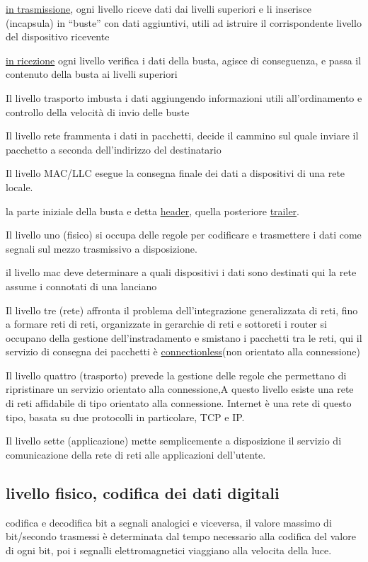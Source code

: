 \documentclass[12pt]{article}
\begin{document}
\underline{in trasmissione}, ogni livello riceve dati dai livelli superiori e li inserisce (incapsula) in “buste” con dati
aggiuntivi, utili ad istruire il corrispondente livello del dispositivo ricevente

\underline{in ricezione} ogni livello verifica i dati della busta, agisce di conseguenza, e passa il contenuto della busta
ai livelli superiori

Il livello trasporto imbusta i dati aggiungendo informazioni utili all’ordinamento e controllo della
velocità di invio delle buste

Il livello rete frammenta i dati in pacchetti, decide il cammino sul quale inviare il pacchetto a
seconda dell’indirizzo del destinatario

Il livello MAC/LLC esegue la consegna finale dei dati a dispositivi di una rete locale.

la parte iniziale della busta e detta \underline{header}, quella posteriore \underline{trailer}.


Il livello uno (fisico) si occupa delle regole per codificare e trasmettere i dati come segnali sul mezzo trasmissivo a disposizione.

il livello mac deve determinare a quali dispositivi i dati sono destinati qui la rete assume i connotati di una lanciano

Il livello tre (rete) affronta il problema dell’integrazione generalizzata di reti, fino a formare reti di reti,
organizzate in gerarchie di reti e sottoreti i router si occupano della gestione dell'instradamento e smistano i pacchetti tra le reti, qui il servizio
di consegna dei pacchetti è \underline{connectionless}(non orientato alla connessione)

Il livello quattro (trasporto) prevede la gestione delle regole che permettano di ripristinare un servizio orientato alla connessione,A questo livello esiste una rete di reti affidabile di tipo orientato alla connessione. Internet è una rete di questo tipo, basata su
due protocolli in particolare, TCP e IP.

Il livello sette (applicazione) mette semplicemente a disposizione il servizio di comunicazione della rete di reti alle applicazioni
dell’utente.

\subsection{livello fisico, codifica dei dati digitali}

codifica e decodifica bit a segnali analogici e viceversa, il valore massimo di bit/secondo trasmessi
è determinata dal tempo necessario alla codifica del valore di ogni bit, poi i segnalli elettromagnetici viaggiano alla velocita della luce.
\end{document}
